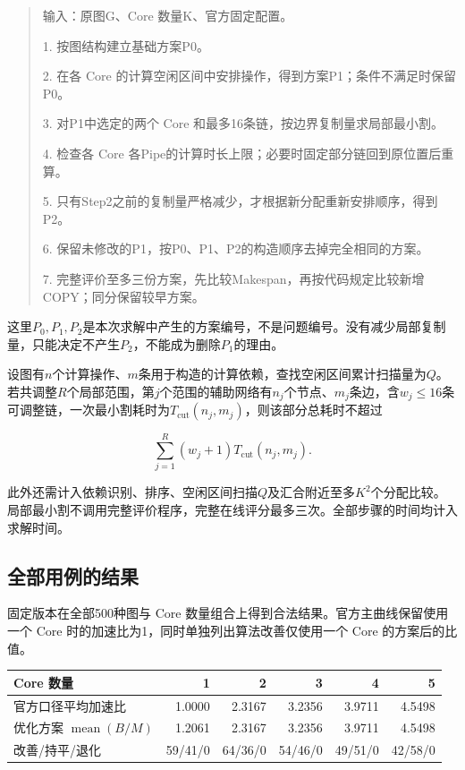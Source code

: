 \documentclass[anonymous,notoc]{gmcm2026}
\begin{document}
\begin{quote}
输入：原图G、Core 数量K、官方固定配置。

1. 按图结构建立基础方案P0。

2. 在各 Core 的计算空闲区间中安排操作，得到方案P1；条件不满足时保留P0。

3. 对P1中选定的两个 Core 和最多16条链，按边界复制量求局部最小割。

4. 检查各 Core 各Pipe的计算时长上限；必要时固定部分链回到原位置后重算。

5. 只有Step2之前的复制量严格减少，才根据新分配重新安排顺序，得到P2。

6. 保留未修改的P1，按P0、P1、P2的构造顺序去掉完全相同的方案。

7. 完整评价至多三份方案，先比较Makespan，再按代码规定比较新增COPY；同分保留较早方案。
\end{quote}

这里\(P_0,P_1,P_2\)是本次求解中产生的方案编号，不是问题编号。没有减少局部复制量，只能决定不产生\(P_2\)，不能成为删除\(P_1\)的理由。

设图有\(n\)个计算操作、\(m\)条用于构造的计算依赖，查找空闲区间累计扫描量为\(Q\)。若共调整\(R\)个局部范围，第\(j\)个范围的辅助网络有\(n_j\)个节点、\(m_j\)条边，含\(w_j\le16\)条可调整链，一次最小割耗时为\(T_{\mathrm{cut}}(n_j,m_j)\)，则该部分总耗时不超过

\[\sum_{j=1}^{R}(w_j+1)T_{\mathrm{cut}}(n_j,m_j).\]

此外还需计入依赖识别、排序、空闲区间扫描\(Q\)及汇合附近至多\(K^2\)个分配比较。局部最小割不调用完整评价程序，完整在线评分最多三次。全部步骤的时间均计入求解时间。

\subsection{全部用例的结果}

固定版本在全部500种图与 Core 数量组合上得到合法结果。官方主曲线保留使用一个 Core 时的加速比为1，同时单独列出算法改善仅使用一个 Core 的方案后的比值。

\begin{table}[!htbp]\centering\small
\begin{tabularx}{\linewidth}{@{}Xrrrrr@{}}\toprule
Core 数量 & 1 & 2 & 3 & 4 & 5 \\
\midrule
官方口径平均加速比 & 1.0000 & 2.3167 & 3.2356 & 3.9711 & 4.5498 \\
优化方案 $\operatorname{mean}(B/M)$ & 1.2061 & 2.3167 & 3.2356 & 3.9711 & 4.5498 \\
改善/持平/退化 & 59/41/0 & 64/36/0 & 54/46/0 & 49/51/0 & 42/58/0 \\
\bottomrule\end{tabularx}\end{table}
\end{document}
